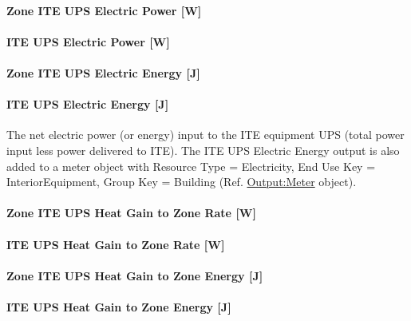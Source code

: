 \paragraph{Zone ITE UPS Electric Power {[}W{]}}\label{zone-ite-ups-electric-power-w}

\paragraph{ITE UPS Electric Power {[}W{]}}\label{ite-ups-electric-power-w}

\paragraph{Zone ITE UPS Electric Energy {[}J{]}}\label{zone-ite-ups-electric-energy-j}

\paragraph{ITE UPS Electric Energy {[}J{]}}\label{ite-ups-electric-energy-j}

The net electric power (or energy) input to the ITE equipment UPS (total power input less power delivered to ITE). The ITE UPS Electric Energy output is also added to a meter object with Resource Type = Electricity, End Use Key = InteriorEquipment, Group Key = Building (Ref. \hyperref[outputmeter-and-outputmetermeterfileonly]{Output:Meter} object).

\paragraph{Zone ITE UPS Heat Gain to Zone Rate {[}W{]}}\label{zone-ite-ups-heat-gain-to-zone-rate-w}

\paragraph{ITE UPS Heat Gain to Zone Rate {[}W{]}}\label{ite-ups-heat-gain-to-zone-rate-w}

\paragraph{Zone ITE UPS Heat Gain to Zone Energy {[}J{]}}\label{zone-ite-ups-heat-gain-to-zone-energy-j}

\paragraph{ITE UPS Heat Gain to Zone Energy {[}J{]}}\label{ite-ups-heat-gain-to-zone-energy-j}

